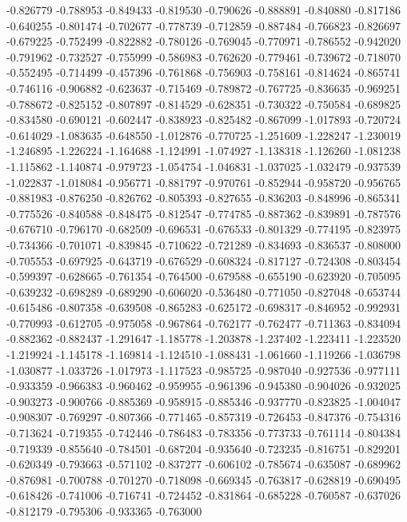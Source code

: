 -0.826779
-0.788953
-0.849433
-0.819530
-0.790626
-0.888891
-0.840880
-0.817186
-0.640255
-0.801474
-0.702677
-0.778739
-0.712859
-0.887484
-0.766823
-0.826697
-0.679225
-0.752499
-0.822882
-0.780126
-0.769045
-0.770971
-0.786552
-0.942020
-0.791962
-0.732527
-0.755999
-0.586983
-0.762620
-0.779461
-0.739672
-0.718070
-0.552495
-0.714499
-0.457396
-0.761868
-0.756903
-0.758161
-0.814624
-0.865741
-0.746116
-0.906882
-0.623637
-0.715469
-0.789872
-0.767725
-0.836635
-0.969251
-0.788672
-0.825152
-0.807897
-0.814529
-0.628351
-0.730322
-0.750584
-0.689825
-0.834580
-0.690121
-0.602447
-0.838923
-0.825482
-0.867099
-1.017893
-0.720724
-0.614029
-1.083635
-0.648550
-1.012876
-0.770725
-1.251609
-1.228247
-1.230019
-1.246895
-1.226224
-1.164688
-1.124991
-1.074927
-1.138318
-1.126260
-1.081238
-1.115862
-1.140874
-0.979723
-1.054754
-1.046831
-1.037025
-1.032479
-0.937539
-1.022837
-1.018084
-0.956771
-0.881797
-0.970761
-0.852944
-0.958720
-0.956765
-0.881983
-0.876250
-0.826762
-0.805393
-0.827655
-0.836203
-0.848996
-0.865341
-0.775526
-0.840588
-0.848475
-0.812547
-0.774785
-0.887362
-0.839891
-0.787576
-0.676710
-0.796170
-0.682509
-0.696531
-0.676533
-0.801329
-0.774195
-0.823975
-0.734366
-0.701071
-0.839845
-0.710622
-0.721289
-0.834693
-0.836537
-0.808000
-0.705553
-0.697925
-0.643719
-0.676529
-0.608324
-0.817127
-0.724308
-0.803454
-0.599397
-0.628665
-0.761354
-0.764500
-0.679588
-0.655190
-0.623920
-0.705095
-0.639232
-0.698289
-0.689290
-0.606020
-0.536480
-0.771050
-0.827048
-0.653744
-0.615486
-0.807358
-0.639508
-0.865283
-0.625172
-0.698317
-0.846952
-0.992931
-0.770993
-0.612705
-0.975058
-0.967864
-0.762177
-0.762477
-0.711363
-0.834094
-0.882362
-0.882437
-1.291647
-1.185778
-1.203878
-1.237402
-1.223411
-1.223520
-1.219924
-1.145178
-1.169814
-1.124510
-1.088431
-1.061660
-1.119266
-1.036798
-1.030877
-1.033726
-1.017973
-1.117523
-0.985725
-0.987040
-0.927536
-0.977111
-0.933359
-0.966383
-0.960462
-0.959955
-0.961396
-0.945380
-0.904026
-0.932025
-0.903273
-0.900766
-0.885369
-0.958915
-0.885346
-0.937770
-0.823825
-1.004047
-0.908307
-0.769297
-0.807366
-0.771465
-0.857319
-0.726453
-0.847376
-0.754316
-0.713624
-0.719355
-0.742446
-0.786483
-0.783356
-0.773733
-0.761114
-0.804384
-0.719339
-0.855640
-0.784501
-0.687204
-0.935640
-0.723235
-0.816751
-0.829201
-0.620349
-0.793663
-0.571102
-0.837277
-0.606102
-0.785674
-0.635087
-0.689962
-0.876981
-0.700788
-0.701270
-0.718098
-0.669345
-0.763817
-0.628819
-0.690495
-0.618426
-0.741006
-0.716741
-0.724452
-0.831864
-0.685228
-0.760587
-0.637026
-0.812179
-0.795306
-0.933365
-0.763000

